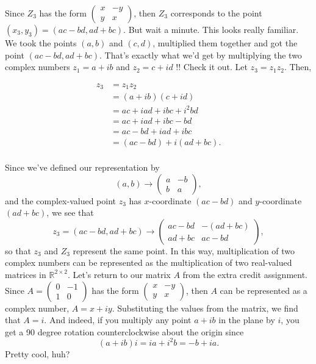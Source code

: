 \documentclass{article}
\begin{document}
Since $Z_3$ has the form $\begin{pmatrix}x & -y\\y & x\end{pmatrix}$, then $Z_3$ corresponds to the point $\left(x_3, y_3\right) = \left(ac - bd, ad + bc \right)$. But wait a minute. This looks really familiar. We took the points $\left(a, b\right)$ and $\left(c, d\right)$, multiplied them together and got the point $\left( ac - bd, ad + bc\right)$. That's exactly what we'd get by multiplying the two complex numbers $z_1 = a + ib$ and $z_2 = c + id$ !! Check it out. Let $z_3 = z_1 z_2$. Then,

\begin{align*}
z_3 &= z_1 z_2\\
&= \left(a + ib\right)\left(c + id\right)\\
&= ac + iad + ibc + i^2bd\\
&= ac + iad + ibc - bd\\
&= ac - bd + iad + ibc\\
&= \left(ac - bd\right) + i\left(ad + bc\right).\\
\end{align*}

Since we've defined our representation by $$\left(a, b\right) \rightarrow \begin{pmatrix}a & -b\\b & a\end{pmatrix},$$ and the complex-valued point $z_3$ has $x$-coordinate $\left(ac - bd\right)$ and $y$-coordinate $\left( ad + bc\right)$, we see that $$z_3 = \left(ac - bd, ad+ bc\right) \rightarrow \begin{pmatrix}ac - bd & -\left(ad + bc\right)\\ad + bc & ac - bd\end{pmatrix},$$ so that $z_3$ and $Z_3$ represent the same point. In this way, multiplication of two complex numbers can be represented as the multiplication of two real-valued matrices in $\mathbb{R}^{2 \times 2}$. Let's return to our matrix $A$ from the extra credit assignment.\\

Since $A = \begin{pmatrix}0 & -1 \\ 1 & 0\end{pmatrix}$ has the form $\begin{pmatrix}x & -y \\ y & x\end{pmatrix}$, then $A$ can be represented as a complex number, $A = x + iy$. Substituting the values from the matrix, we find that $A = i.$ And indeed, if you multiply any point $a + ib$ in the plane by $i$, you get a 90 degree rotation counterclockwise about the origin since $$\left(a + ib\right)i = ia + i^2b = -b + ia.$$ 
Pretty cool, huh?
\end{document}
